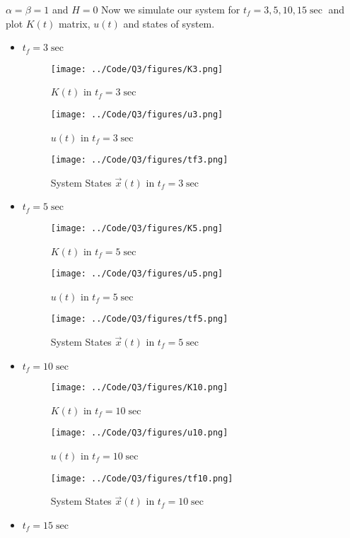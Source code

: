 $\alpha = \beta = 1$ and $H = 0$
Now we simulate our system for $t_f = 3, 5, 10, 15\sec$ and plot $K(t)$ matrix, $u(t)$ and states of system.
\begin{itemize}
	\item $t_f = 3\sec$
	\begin{figure}[H]
		\caption{$K(t)$ in $t_f = 3\sec$}
		\centering
		\texttt{[image: ../Code/Q3/figures/K3.png]}
	\end{figure}
\begin{figure}[H]
	\caption{$u(t)$ in $t_f = 3\sec$}
	\centering
	\texttt{[image: ../Code/Q3/figures/u3.png]}
\end{figure}
\begin{figure}[H]
	\caption{System States $\vec x(t)$ in $t_f = 3\sec$}
	\centering
	\texttt{[image: ../Code/Q3/figures/tf3.png]}
\end{figure}
	\item $t_f = 5\sec$
	\begin{figure}[H]
		\caption{$K(t)$ in $t_f = 5\sec$}
		\centering
		\texttt{[image: ../Code/Q3/figures/K5.png]}
	\end{figure}
	\begin{figure}[H]
		\caption{$u(t)$ in $t_f = 5\sec$}
		\centering
		\texttt{[image: ../Code/Q3/figures/u5.png]}
	\end{figure}
	\begin{figure}[H]
		\caption{System States $\vec x(t)$ in $t_f = 5\sec$}
		\centering
		\texttt{[image: ../Code/Q3/figures/tf5.png]}
	\end{figure}
\item $t_f = 10\sec$
\begin{figure}[H]
	\caption{$K(t)$ in $t_f = 10\sec$}
	\centering
	\texttt{[image: ../Code/Q3/figures/K10.png]}
\end{figure}
\begin{figure}[H]
	\caption{$u(t)$ in $t_f = 10\sec$}
	\centering
	\texttt{[image: ../Code/Q3/figures/u10.png]}
\end{figure}
\begin{figure}[H]
	\caption{System States $\vec x(t)$ in $t_f = 10\sec$}
	\centering
	\texttt{[image: ../Code/Q3/figures/tf10.png]}
\end{figure}
\item $t_f = 15\sec$
\begin{figure}[H]

\end{figure}
\end{itemize}
